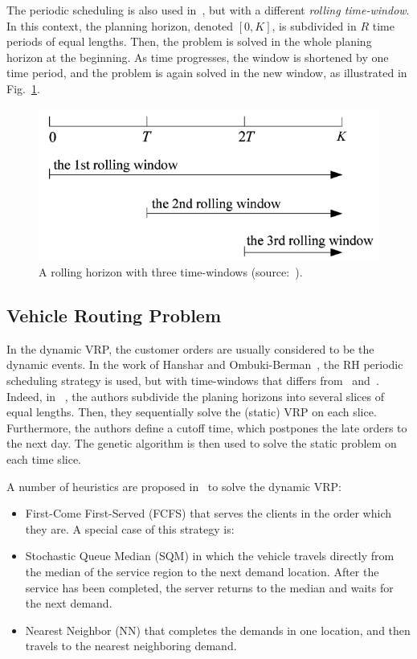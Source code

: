 \begin{itemize}
	The periodic scheduling is also used in~\cite{tang2010}, but with a different \textit{rolling time-window}. In this context, the planning horizon, denoted $[0,K]$, is subdivided in $R$ time periods of equal lengths. Then, the problem is solved in the whole planing horizon at the beginning. As time progresses, the window is shortened by one time period, and the problem is again solved in the new window, as illustrated in Fig.~\ref{fig:tw-whole}.
	
	
	\begin{figure}[h!]
		\centering
		\includegraphics[width=.6\textwidth]{images/tw-whole}
		\caption{A rolling horizon with three time-windows (source:~\cite{tang2010}).}
		\label{fig:tw-whole}
	\end{figure}
	
\end{itemize}



\subsection{Vehicle Routing Problem}

In the dynamic \acs{VRP}, the customer orders are usually considered to be the dynamic events. In the work of Hanshar and Ombuki-Berman~\cite{hanshar2007}, the \acs{RH} periodic scheduling strategy is used, but with time-windows that differs from~\cite{sun1994} and~\cite{tang2010}. Indeed, in~\cite{hanshar2007} , the authors subdivide the planing horizons into several slices of equal lengths. Then, they sequentially solve the (static) VRP on each slice. Furthermore, the authors define a cutoff time, which postpones the late orders to the next day. The genetic algorithm is then used to solve the static problem on each time slice.

A number of heuristics are proposed in~\cite{larsen2002} to solve the dynamic VRP:

\begin{itemize}
	\item First-Come First-Served (FCFS) that serves the clients in the order which they are. A special case of this strategy is:
	
	\item Stochastic Queue Median (SQM) in which the vehicle travels directly from the median of the service region to the next demand location. After the service has been completed, the server returns to the median and waits for the next demand.
	
	\item Nearest Neighbor (NN) that completes the demands in one location, and then travels to the nearest neighboring demand.
\end{itemize}




